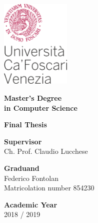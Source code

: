 \begin{titlepage}
	\includegraphics[width=0.25\textwidth]{0-resources/logo_ca_foscari.png}
   \begin{center}
       \vspace*{2.5cm}
       \textbf{Master’s Degree \\
       	in Computer Science}
 
       \vspace{2.5cm}
       \textbf{Final Thesis}
 
       \vspace{1cm}
		\textbf{\Large\thetitle}
   \end{center}

	\begin{adjustwidth}{0.7cm}{0cm}
		\vspace{5cm}
		\textbf{Supervisor}\\
		Ch. Prof. Claudio Lucchese
		
	
		\vspace{0.5cm}
		\noindent\textbf{Graduand}\\
		Federico Fontolan\\
		Matricolation number 854230
		
		\vspace{0.5cm}
		\noindent\textbf{Academic Year}\\
		2018 / 2019
	\end{adjustwidth}
	
\end{titlepage}